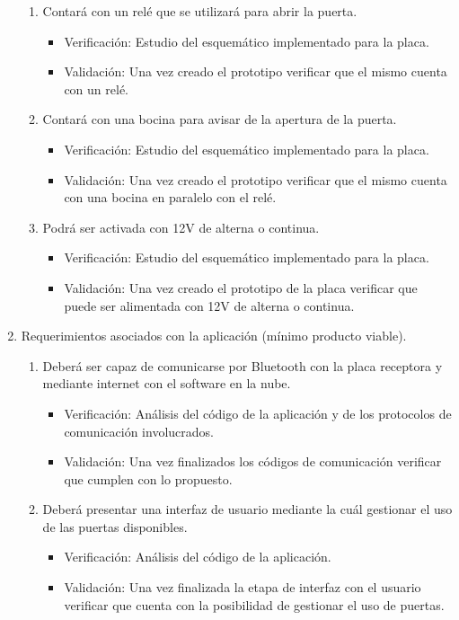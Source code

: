 \documentclass[11pt]{charter}
\begin{document}
\begin{enumerate}
\begin{enumerate}
	\item Contará con un relé que se utilizará para abrir la puerta.
		\begin{itemize}
		\item Verificación: Estudio del esquemático implementado para la placa.
		\item Validación: Una vez creado el prototipo verificar que el mismo cuenta con un relé.
		\end{itemize}
	
	\item Contará con una bocina para avisar de la apertura de la puerta.
		\begin{itemize}
		\item Verificación: Estudio del esquemático implementado para la placa.
		\item Validación: Una vez creado el prototipo verificar que el mismo cuenta con una bocina en paralelo con el relé.
		\end{itemize}
	
	\item Podrá ser activada con 12V de alterna o continua.
		\begin{itemize}
		\item Verificación: Estudio del esquemático implementado para la placa.
		\item Validación: Una vez creado el prototipo de la placa verificar que puede ser alimentada con 12V de alterna o continua.
		\end{itemize}
		
	\end{enumerate}
\item Requerimientos asociados con la aplicación (mínimo producto viable).	
	\begin{enumerate}
	\item Deberá ser capaz de comunicarse por Bluetooth con la placa receptora y mediante internet con el software en la nube.
		\begin{itemize}
		\item Verificación: Análisis del código de la aplicación y de los protocolos de comunicación involucrados.
		\item Validación: Una vez finalizados los códigos de comunicación verificar que cumplen con lo propuesto.
		\end{itemize}
		
	\item Deberá presentar una interfaz de usuario mediante la cuál gestionar el uso de las puertas disponibles.
		\begin{itemize}
		\item Verificación: Análisis del código de la aplicación.
		\item Validación: Una vez finalizada la etapa de interfaz con el usuario verificar que cuenta con la posibilidad de gestionar el uso de puertas.
		\end{itemize}
		

\end{enumerate}
\end{enumerate}
\end{document}
